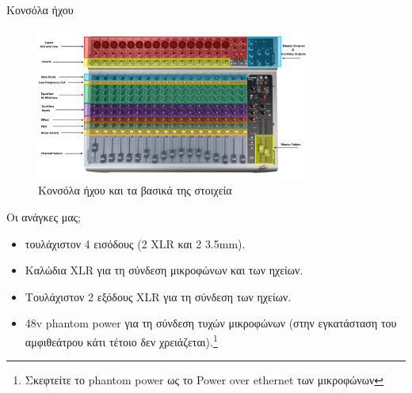 \documentclass{beamer}
\begin{document}
\begin{frame}[allowframebreaks]{Κονσόλα ήχου}
  \begin{figure}
    \centering
    \includegraphics[width=0.8\textwidth]{images/mixer.png}
    \caption{Κονσόλα ήχου και τα βασικά της στοιχεία}
  \end{figure}

  \begin{block}{Οι ανάγκες μας;}
    \begin{itemize}
    \item τουλάχιστον 4 εισόδους (2 XLR και 2 3.5mm).
    \item Καλώδια XLR για τη σύνδεση μικροφώνων και των ηχείων.
    \item Τουλάχιστον 2 εξόδους XLR για τη σύνδεση των ηχείων.
    \item 48v phantom power για τη σύνδεση τυχών μικροφώνων (στην εγκατάσταση
    του αμφιθεάτρου κάτι τέτοιο δεν χρειάζεται).\footnote{Σκεφτείτε το phantom power ως το Power over ethernet των μικροφώνων}
    \end{itemize}
  \end{block}
\end{frame}
\end{document}
